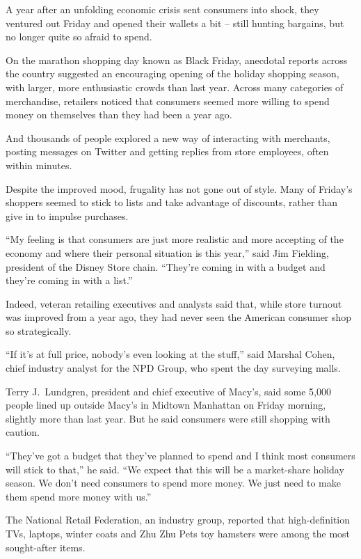 ﻿\documentclass[12pt]{article}
\begin{document}
\lettrine{A}{} year after an unfolding economic crisis sent consumers into
shock, they ventured out Friday and opened their wallets a bit -- still hunting bargains, but no
longer quite so afraid to spend.

On the marathon shopping day known as Black Friday, anecdotal reports across the country suggested
an encouraging opening of the holiday shopping season, with larger, more enthusiastic crowds than
last year. Across many categories of merchandise, retailers noticed that consumers seemed more
willing to spend money on themselves than they had been a year ago.

And thousands of people explored a new way of interacting with merchants, posting messages on
Twitter and getting replies from store employees, often within minutes.

Despite the improved mood, frugality has not gone out of style. Many of Friday's shoppers seemed to
stick to lists and take advantage of discounts, rather than give in to impulse purchases.

``My feeling is that consumers are just more realistic and more accepting of the economy and where
their personal situation is this year,'' said Jim Fielding, president of the Disney Store chain.
``They're coming in with a budget and they're coming in with a list.''

Indeed, veteran retailing executives and analysts said that, while store turnout was improved from a
year ago, they had never seen the American consumer shop so strategically.

``If it's at full price, nobody's even looking at the stuff,'' said Marshal Cohen, chief industry
analyst for the NPD Group, who spent the day surveying malls.

Terry J.~Lundgren, president and chief executive of Macy's, said some 5,000 people lined up outside
Macy's in Midtown Manhattan on Friday morning, slightly more than last year. But he said consumers
were still shopping with caution.

``They've got a budget that they've planned to spend and I think most consumers will stick to
that,'' he said. ``We expect that this will be a market-share holiday season. We don't need
consumers to spend more money. We just need to make them spend more money with us.''

The National Retail Federation, an industry group, reported that high-definition TVs, laptops,
winter coats and Zhu Zhu Pets toy hamsters were among the most sought-after items.
\end{document}
